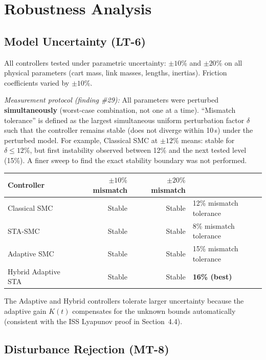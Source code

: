 \documentclass[11pt, a4paper]{article}
\begin{document}
\section{Robustness Analysis}

\subsection{Model Uncertainty (LT-6)}

All controllers tested under parametric uncertainty: $\pm10\%$ and $\pm20\%$
on all physical parameters (cart mass, link masses, lengths, inertias).
Friction coefficients varied by $\pm10\%$.

\textit{Measurement protocol (finding \#29):}
All parameters were perturbed \textbf{simultaneously} (worst-case combination,
not one at a time). ``Mismatch tolerance'' is defined as the largest
simultaneous uniform perturbation factor $\delta$ such that the controller
remains stable (does not diverge within 10\,s) under the perturbed model.
For example, Classical SMC at $\pm12\%$ means: stable for $\delta \leq 12\%$,
but first instability observed between 12\% and the next tested level (15\%).
A finer sweep to find the exact stability boundary was not performed.

\begin{center}
\begin{tabular}{@{}p{3.5cm}rrl@{}}
\toprule
\textbf{Controller} & \textbf{$\pm10\%$ mismatch} & \textbf{$\pm20\%$ mismatch} & \\
\midrule
Classical SMC         & Stable   & Stable  & 12\% mismatch tolerance \\
STA-SMC               & Stable   & Stable  & 8\% mismatch tolerance  \\
Adaptive SMC          & Stable   & Stable  & 15\% mismatch tolerance \\
Hybrid Adaptive STA   & Stable   & Stable  & \textbf{16\% (best)}    \\
\bottomrule
\end{tabular}
\end{center}

The Adaptive and Hybrid controllers tolerate larger uncertainty
because the adaptive gain $K(t)$ compensates for the unknown bounds
automatically (consistent with the ISS Lyapunov proof in Section~4.4).

\subsection{Disturbance Rejection (MT-8)}
\end{document}
